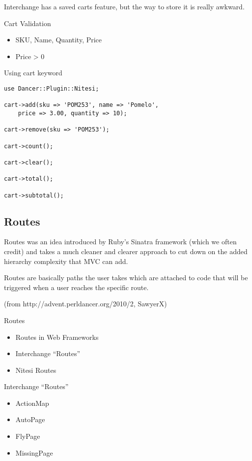 Interchange has a saved carts feature, but the way to store it is
really awkward.

\begin{frame}{Cart Validation}
\begin{itemize}
\item SKU, Name, Quantity, Price
\item Price > 0
\end{itemize}
\end{frame}

\begin{frame}[fragile]{Using cart keyword}
\begin{lstlisting}
use Dancer::Plugin::Nitesi;

cart->add(sku => 'POM253', name => 'Pomelo',
    price => 3.00, quantity => 10);

cart->remove(sku => 'POM253');

cart->count();

cart->clear();

cart->total();

cart->subtotal();
\end{lstlisting}
\end{frame}

\subsection{Routes}

Routes was an idea introduced by Ruby's Sinatra framework (which we often
credit) and takes a much cleaner and clearer approach to cut down on the
added hierarchy complexity that MVC can add.

Routes are basically paths the user takes which are attached to code that
will be triggered when a user reaches the specific route.

(from http://advent.perldancer.org/2010/2, SawyerX)

\begin{frame}{Routes}
\begin{itemize}
\item Routes in Web Frameworks
\item Interchange ``Routes''
\item Nitesi Routes
\end{itemize}
\end{frame}


\begin{frame}{Interchange ``Routes''}
\begin{itemize}
\item ActionMap
\item AutoPage
\item FlyPage
\item MissingPage
\end{itemize}
\end{frame}

